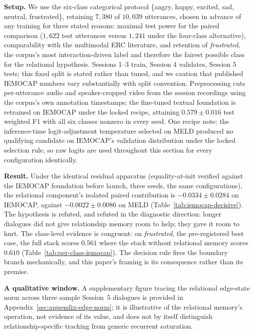 \noindent\textbf{Setup.} We use the six-class categorical protocol \{angry, happy, excited, sad, neutral, frustrated\}, retaining $7{,}380$ of $10{,}039$ utterances, chosen in advance of any training for three stated reasons: maximal test power for the paired comparison ($1{,}622$ test utterances versus $1{,}241$ under the four-class alternative), comparability with the multimodal ERC literature, and retention of \textit{frustrated}, the corpus's most interaction-driven label and therefore the fairest possible class for the relational hypothesis. Sessions 1--3 train, Session 4 validates, Session 5 tests; this fixed split is stated rather than tuned, and we caution that published IEMOCAP numbers vary substantially with split convention. Preprocessing cuts per-utterance audio and speaker-cropped video from the session recordings using the corpus's own annotation timestamps; the fine-tuned textual foundation is retrained on IEMOCAP under the locked recipe, attaining $0.579 \pm 0.016$ test weighted F1 with all six classes nonzero in every seed. One recipe note: the inference-time logit-adjustment temperature selected on MELD produced no qualifying candidate on IEMOCAP's validation distribution under the locked selection rule, so raw logits are used throughout this section for every configuration identically.

\noindent\textbf{Result.} Under the identical residual apparatus (equality-at-init verified against the IEMOCAP foundation before launch, three seeds, the same configurations), the relational component's isolated paired contribution is $\mathbf{-0.0334 \pm 0.0284}$ on IEMOCAP, against $-0.0022 \pm 0.0086$ on MELD (Table~\ref{tab:iemocap-decisive}). The hypothesis is refuted, and refuted in the diagnostic direction: longer dialogues did not give relationship memory room to help; they gave it room to hurt. The class-level evidence is congruent: on \textit{frustrated}, the pre-registered best case, the full stack scores $0.561$ where the stack without relational memory scores $0.610$ (Table~\ref{tab:per-class-iemocap}). The decision rule fires the boundary branch mechanically, and this paper's framing is its consequence rather than its premise.




\noindent\textbf{A qualitative window.} A supplementary figure tracing the relational edge-state norm across three sample Session~5 dialogues is provided in Appendix~\ref{sec:appendix-edge-norm}; it is illustrative of the relational memory's operation, not evidence of its value, and does not by itself distinguish relationship-specific tracking from generic recurrent saturation.

